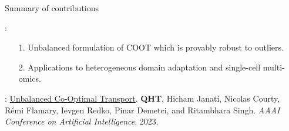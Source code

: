 \documentclass{beamer}
\begin{document}
\begin{frame}{Summary of contributions}
  \scriptsize


  \vspace{5cm}
  {}:
  \begin{enumerate}
    \setlength\itemindent{10pt}
    \item[1.] Unbalanced formulation of COOT which is provably robust to outliers.
    \item[2.] Applications to heterogeneous domain adaptation and single-cell multi-omics.
  \end{enumerate}

  \vspace{0.3cm}
  {}: \ul{Unbalanced Co-Optimal Transport}.
  \textbf{QHT}, Hicham Janati, Nicolas Courty, Rémi Flamary, Ievgen Redko,
  Pinar Demetci, and Ritambhara Singh.
  \textit{AAAI Conference on Artificial Intelligence}, 2023.

\end{frame}
\end{document}
